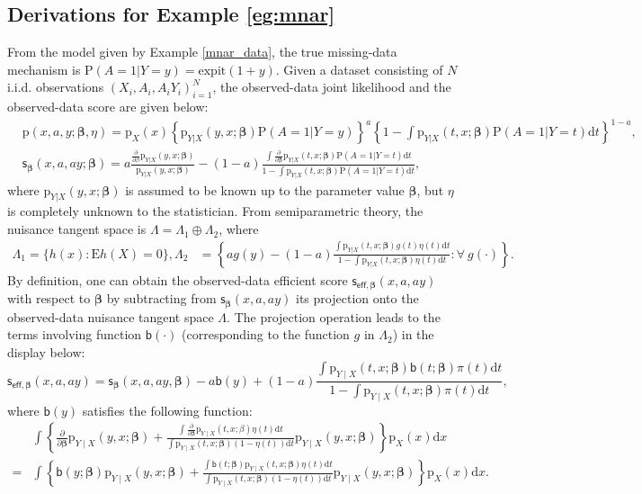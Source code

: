 \documentclass{article}
\def\eff{\mathsf{eff}}
\def\sfb{\mathsf{b}}
\def\sfb{\mathsf{b}}
\def\expit{\mathrm{expit}}
\def\sfs{\mathsf{s}}
\theoremstyle{plain}
\theoremstyle{definition}
\theoremstyle{remark}
\def\diff{\mathrm{d}}
\def\P{\mathrm{P}}
\def\bbeta{\boldsymbol{\beta}}
\def\E{\mathrm{E}}
\def\p{\mathrm{p}}
\begin{document}
\subsection{Derivations for Example \ref{eg:mnar}}
\label{app:proofmnar}
From the model given by Example \ref{mnar_data}, the true missing-data mechanism is $\P (A = 1 | Y = y) = \expit (1 + y)$. Given a dataset consisting of $N$ i.i.d. observations $(X_i, A_i, A_i Y_i)^N_{i=1}$, the observed-data joint likelihood and the observed-data score are given below:
\begin{align*}
    & \p (x, a, y; \bbeta, \eta) = \p_X (x) \left\{\p_{Y | X} (y, x; \bbeta) \P (A = 1 | Y = y) \right\}^a \left\{1-\int \p_{Y | X} (t, x; \bbeta) \P (A = 1 | Y = t) \mathrm{d} t \right\}^{1 - a}, \\
& \sfs_\bbeta(x, a, a y; \bbeta) = a \frac{\frac{\partial}{\partial \beta} \p_{Y | X}(y, x ; \bbeta)}{\p_{Y | X} (y, x ; \bbeta)} - (1 - a) \frac{\int \frac{\partial}{\partial \bbeta} \p_{Y | X}(t, x ; \bbeta) \P (A = 1 | Y = t) \mathrm{d} t}{1-\int \p_{Y | X}(t, x; \bbeta) \P (A = 1 | Y = t) \mathrm{d} t},
\end{align*}
where $\p_{Y | X} (y, x; \bbeta)$ is assumed to be known up to the parameter value $\bbeta$, but $\eta$ is completely unknown to the statistician. From semiparametric theory, the nuisance tangent space is $\Lambda=\Lambda_1 \oplus \Lambda_2$, where
\begin{align*}
\Lambda_{1} = \{h(x): \E h (X) = 0\}, \Lambda_2 & =\left\{a g (y)-(1-a) \frac{\int \p_{Y | X}(t, x ; \bbeta) g (t) \eta(t) \mathrm{d} t}{1-\int \p_{Y | X}(t, x ; \bbeta) \eta(t) \mathrm{d} t}: \forall \ g (\cdot)\right\}.
\end{align*}
By definition, one can obtain the observed-data efficient score $\sfs_{\eff, \bbeta} (x, a, ay)$ with respect to $\bbeta$ by subtracting from $\sfs_{\bbeta} (x, a, ay)$ its projection onto the observed-data nuisance tangent space $\Lambda$. The projection operation leads to the terms involving function $\sfb (\cdot)$ (corresponding to the function $g$ in $\Lambda_2$) in the display below:
\begin{equation*}
    \sfs_{\eff, \bbeta}(x, a, a y)=\sfs_\bbeta(x, a, a y, \bbeta)-a \sfb(y)+(1-a) \frac{\int \p_{Y \mid X}(t, x; \bbeta) \sfb(t ; \bbeta) \pi(t) \mathrm{d} t}{1-\int \p_{Y \mid X}(t, x ; \bbeta) \pi(t) \mathrm{d} t},
\end{equation*}
where $\sfb(y)$ satisfies the following function:
\begin{equation*}
    \begin{aligned}
& \int\left\{\frac{\partial}{\partial \bbeta} \p_{Y \mid X}(y, x ; \bbeta)+\frac{\int \frac{\partial}{\partial \bbeta} \p_{Y \mid X}(t, x ; \beta) \eta(t) \mathrm{d} t}{\int \p_{Y \mid X}(t, x ; \bbeta)(1-\eta(t)) \diff t} \p_{Y \mid X}(y, x ; \bbeta)\right\} \p_X(x) \mathrm{d} x \\
= & \int\left\{\sfb(y ; \bbeta) \p_{Y \mid X}(y, x ; \bbeta)+\frac{\int \sfb(t ; \bbeta) \p_{Y \mid X}(t, x ; \bbeta) \eta(t) \mathrm{d} t}{\int \p_{Y \mid X}(t, x ; \bbeta)(1-\eta(t)) \mathrm{d} t} \p_{Y \mid X}(y, x ; \bbeta)\right\} \p_X(x) \mathrm{d} x.
\end{aligned}
\end{equation*}
\end{document}
